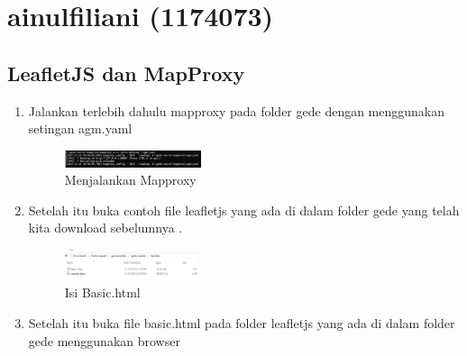 \section{ainulfiliani (1174073)}
\subsection{LeafletJS dan MapProxy}
\begin{enumerate}
    \item Jalankan terlebih dahulu mapproxy pada folder gede dengan menggunakan setingan agm.yaml
        \hfill\break
        \begin{figure}[H]
        \includegraphics[width=4cm]{figures/tugas5/1174073/1.jpg}
        \centering
        \caption{Menjalankan Mapproxy}
        \end{figure}
        
        
    \item Setelah itu buka contoh file leafletjs yang ada di dalam folder gede  yang telah kita download sebelumnya .
    
  \hfill\break
  \begin{figure}[H]
  \includegraphics[width=4cm]{figures/tugas5/1174073/2.jpg}
  \centering
  \caption{Isi Basic.html}
  \end{figure}
  
    \item Setelah itu buka file basic.html pada folder leafletjs yang ada di dalam folder gede menggunakan browser
        \hfill\break
        \begin{figure}[H]
        

\end{figure}
\end{enumerate}
